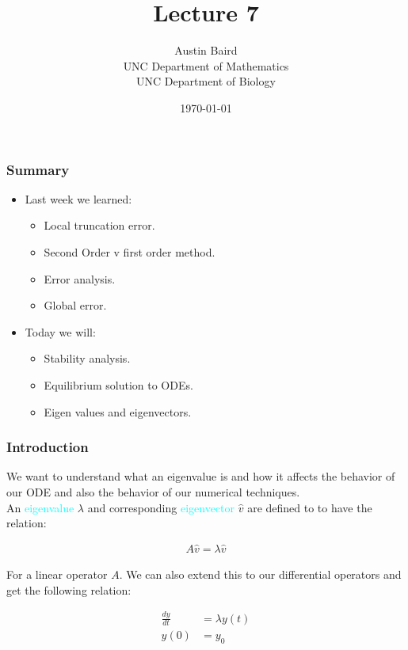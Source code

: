 \documentclass{beamer}
\title{Lecture 7}
\author{Austin Baird\\UNC Department of Mathematics\\UNC Department of Biology}
\date{\today}
\begin{document}
\frame{\titlepage}

\begin{frame}
\frametitle{Summary}
\begin{itemize}

\item Last week we learned: 
\begin{itemize}
\item Local truncation error.
\item Second Order v first order method.
\item Error analysis. 
\item Global error. 
\end{itemize}
\item Today we will: 
\begin{itemize}
\item Stability analysis.
\item Equilibrium solution to ODEs. 
\item Eigen values and eigenvectors.
\end{itemize}
\end{itemize}

\end{frame}

\begin{frame}
\frametitle{Introduction}

We want to understand what an eigenvalue is and how it affects the behavior of our ODE and also the behavior of our numerical techniques. \\
An \textcolor{cyan}{eigenvalue} $\lambda$  and corresponding \textcolor{cyan}{eigenvector} \textbf{$\hat{v}$} are defined to to have the relation: 

\begin{align*}
A\hat{v} = \lambda\hat{v}
\end{align*}

For a linear operator $A$. We can also extend this to our differential operators and get the following relation: 

\begin{align*}
\frac{dy}{dt}& = \lambda y(t)\\
y(0) &= y_0
\end{align*}

\end{frame}
\end{document}
